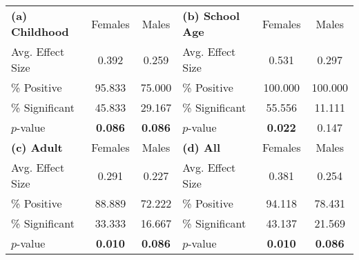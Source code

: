 
\begin{tabular}{lcclcc} 
\toprule
 \textbf{(a) Childhood} & Females & Males & \textbf{(b) School Age}  & Females & Males \\
 \cmidrule(lr){2-3} \cmidrule(lr){5-6}
\quad Avg. Effect Size &     0.392 &     0.259 				&  \quad Avg. Effect Size &     0.531 &     0.297 \\  
\quad \% Positive &    95.833 &    75.000 				&	  \quad \% Positive &   100.000 &   100.000 \\  
\quad \% Significant &    45.833 &    29.167 			& \quad \% Significant  &    55.556 &    11.111 \\  
\quad $p$-value &     \textbf{0.086} &     \textbf{0.086} 	&  \quad $p$-value &     \textbf{0.022} &     0.147 \\  
 \midrule
  \textbf{(c) Adult} &Females & Males  & \textbf{(d) All}  &Females & Males  \\
   \cmidrule(lr){2-3} \cmidrule(lr){5-6}
\quad Avg. Effect Size &     0.291 &     0.227 						& \quad Avg. Effect Size&     0.381 &     0.254 \\  
\quad \% Positive &    88.889 &    72.222 				&  \quad \% Positive  &    94.118 &    78.431 \\  
\quad \% Significant &    33.333 &    16.667 			&  \quad \% Significant &    43.137 &    21.569 \\  
\quad $p$-value &     \textbf{0.010} &     \textbf{0.086} 	&  \quad $p$-value &     \textbf{0.010} &     \textbf{0.086} \\  
\bottomrule
\end{tabular}


